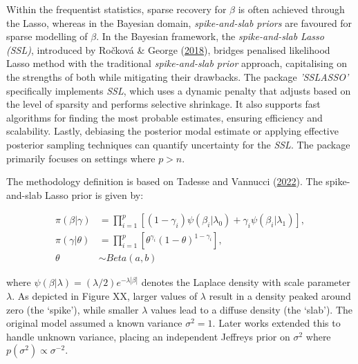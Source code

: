 \documentclass[
  11pt,
]{article}
\begin{document}
Within the frequentist statistics, sparse recovery for \(\beta\) is
often achieved through the Lasso, whereas in the Bayesian domain,
\emph{spike-and-slab priors} are favoured for sparse modelling of
\(\beta\). In the Bayesian framework, the \emph{spike-and-slab Lasso
(SSL)}, introduced by Ročková \& George
(\protect\hyperlink{ref-Rockova2018}{2018}), bridges penalised
likelihood Lasso method with the traditional \emph{spike-and-slab prior}
approach, capitalising on the strengths of both while mitigating their
drawbacks. The package \emph{'SSLASSO'} specifically implements
\emph{SSL}, which uses a dynamic penalty that adjusts based on the level
of sparsity and performs selective shrinkage. It also supports fast
algorithms for finding the most probable estimates, ensuring efficiency
and scalability. Lastly, debiasing the posterior modal estimate or
applying effective posterior sampling techniques can quantify
uncertainty for the \emph{SSL}. The package primarily focuses on
settings where \(p > n\).

The methodology definition is based on Tadesse and Vannucci
(\protect\hyperlink{ref-Tadesse2022}{2022}). The spike-and-slab Lasso
prior is given by:

\begin{align*}
\pi(\beta|\gamma) &= \prod_{i=1}^{p} [(1 - \gamma_i) \psi (\beta_i | \lambda_0) + \gamma_i \psi (\beta_i|\lambda_1)], \\
\pi(\gamma|\theta) &= \prod_{i=1}^{p} [\theta^{\gamma_i} (1-\theta)^{1-\gamma_i}], \\
\theta &\sim Beta(a, b)
\end{align*}

where \(\psi(\beta | \lambda) = (\lambda/2)e^{-\lambda|\beta|}\) denotes
the Laplace density with scale parameter \(\lambda\). As depicted in
Figure XX, larger values of \(\lambda\) result in a density peaked
around zero (the `spike'), while smaller \(\lambda\) values lead to a
diffuse density (the `slab'). The original model assumed a known
variance \(\sigma^2 = 1\). Later works extended this to handle unknown
variance, placing an independent Jeffreys prior on \(\sigma^2\) where
\(p(\sigma^2) \propto \sigma^{-2}\).
\end{document}
